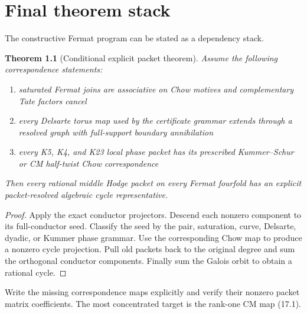 \documentclass[11pt,oneside]{book}
\newtheorem{theorem}{Theorem}[chapter]
\theoremstyle{definition}
\theoremstyle{remark}
\begin{document}
\chapter{Final theorem stack}
The constructive Fermat program can be stated as a dependency stack.

\begin{theorem}[Conditional explicit packet theorem]
Assume the following correspondence statements:
\begin{enumerate}
\item saturated Fermat joins are associative on Chow motives and complementary Tate factors cancel
\item every Delsarte torus map used by the certificate grammar extends through a resolved graph with full-support boundary annihilation
\item every K5, K4, and K23 local phase packet has its prescribed Kummer--Schur or CM half-twist Chow correspondence
\end{enumerate}
Then every rational middle Hodge packet on every Fermat fourfold has an explicit packet-resolved algebraic cycle representative.
\end{theorem}
\begin{proof}
Apply the exact conductor projectors. Descend each nonzero component to its full-conductor seed. Classify the seed by the pair, saturation, curve, Delsarte, dyadic, or Kummer phase grammar. Use the corresponding Chow map to produce a nonzero cycle projection. Pull old packets back to the original degree and sum the orthogonal conductor components. Finally sum the Galois orbit to obtain a rational cycle.
\end{proof}

\begin{openproblem}
Write the missing correspondence maps explicitly and verify their nonzero packet matrix coefficients. The most concentrated target is the rank-one CM map (17.1).
\end{openproblem}
\end{document}
